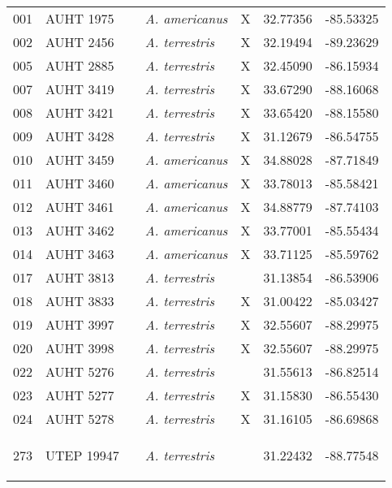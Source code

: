 \begin{longtable}{ lllllll }
001 & AUHT 1975 &  & \textit{A. americanus} & X & 32.77356 & -85.53325 \\ 
002 & AUHT 2456 &  & \textit{A. terrestris} & X & 32.19494 & -89.23629 \\ 
005 & AUHT 2885 &  & \textit{A. terrestris} & X & 32.45090 & -86.15934 \\ 
007 & AUHT 3419 &  & \textit{A. terrestris} & X & 33.67290 & -88.16068 \\ 
008 & AUHT 3421 &  & \textit{A. terrestris} & X & 33.65420 & -88.15580 \\ 
009 & AUHT 3428 &  & \textit{A. terrestris} & X & 31.12679 & -86.54755 \\ 
010 & AUHT 3459 &  & \textit{A. americanus} & X & 34.88028 & -87.71849 \\ 
011 & AUHT 3460 &  & \textit{A. americanus} & X & 33.78013 & -85.58421 \\ 
012 & AUHT 3461 &  & \textit{A. americanus} & X & 34.88779 & -87.74103 \\ 
013 & AUHT 3462 &  & \textit{A. americanus} & X & 33.77001 & -85.55434 \\ 
014 & AUHT 3463 &  & \textit{A. americanus} & X & 33.71125 & -85.59762 \\ 
017 & AUHT 3813 &  & \textit{A. terrestris} &  & 31.13854 & -86.53906 \\ 
018 & AUHT 3833 &  & \textit{A. terrestris} & X & 31.00422 & -85.03427 \\ 
019 & AUHT 3997 &  & \textit{A. terrestris} & X & 32.55607 & -88.29975 \\ 
020 & AUHT 3998 &  & \textit{A. terrestris} & X & 32.55607 & -88.29975 \\ 
022 & AUHT 5276 &  & \textit{A. terrestris} &  & 31.55613 & -86.82514 \\ 
023 & AUHT 5277 &  & \textit{A. terrestris} & X & 31.15830 & -86.55430 \\ 
024 & AUHT 5278 &  & \textit{A. terrestris} & X & 31.16105 & -86.69868 \\ 
273 & UTEP 19947 &  & \textit{A. terrestris} &  & 31.22432 & -88.77548

\label{table:loanedHyb }
\end{longtable}